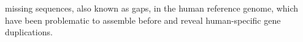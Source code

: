 missing sequences, also known as gaps, in the human reference genome, which have been problematic to assemble before and reveal human-specific gene duplications.   
%
%









